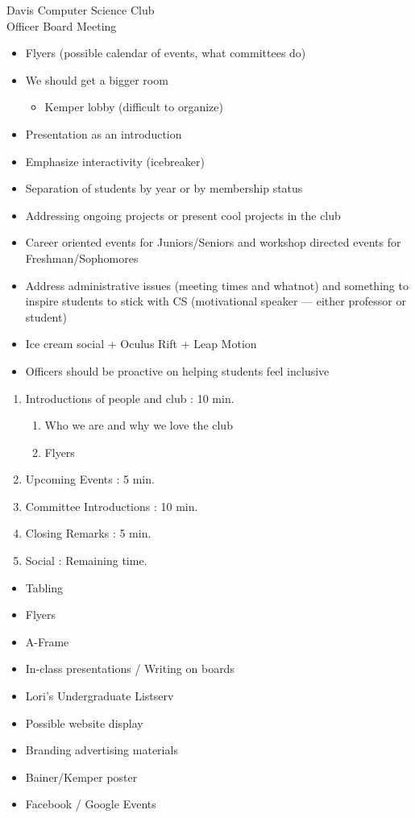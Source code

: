 \documentclass{article}
\begin{document}
\begin{Minutes}{Davis Computer Science Club\\Officer Board Meeting}
\begin{itemize}
	\item Flyers (possible calendar of events, what committees do)
	\item We should get a bigger room
	\begin{itemize}
		\item Kemper lobby (difficult to organize)
	\end{itemize}
	\item Presentation as an introduction
	\item Emphasize interactivity (icebreaker)
	\item Separation of students by year or by membership status
	\item Addressing ongoing projects or present cool projects in the club
	\item Career oriented events for Juniors/Seniors and workshop directed events for Freshman/Sophomores
	\item Address administrative issues (meeting times and whatnot) and something to inspire students to stick with CS (motivational speaker --- either professor or student)
	\item Ice cream social + Oculus Rift + Leap Motion
	\item Officers should be proactive on helping students feel inclusive
\end{itemize}


\begin{enumerate}
	\item Introductions of people and club : 10 min.
	\begin{enumerate}
		\item Who we are and why we love the club
		\item Flyers
	\end{enumerate}
	\item Upcoming Events : 5 min.
	\item Committee Introductions : 10 min.
	\item Closing Remarks : 5 min.
	\item Social : Remaining time.
\end{enumerate}


\begin{itemize}
	\item Tabling
	\item Flyers
	\item A-Frame
	\item In-class presentations / Writing on boards
	\item Lori's Undergraduate Listserv
	\item Possible website display
	\item Branding advertising materials
	\item Bainer/Kemper poster
	\item Facebook / Google Events
\end{itemize}


\end{Minutes}
\end{document}
